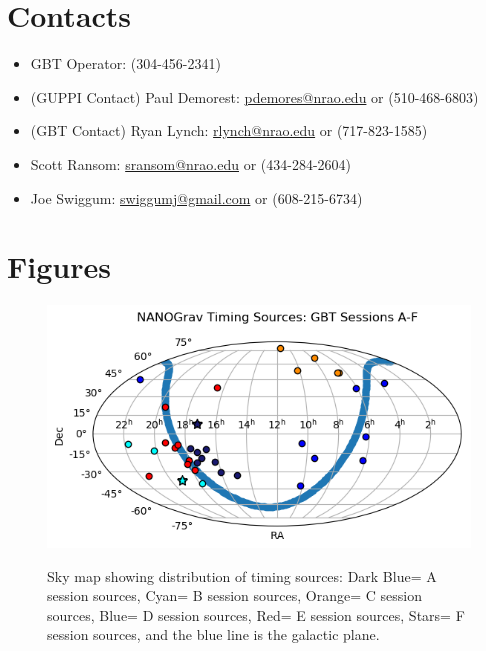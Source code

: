 \documentclass[11pt, reqno, tbtags]{article}
\begin{document}
\section{Contacts}\label{sec:con}  %
\begin{itemize}
 \item GBT Operator: (304-456-2341)
 \item (GUPPI Contact) Paul Demorest: \href{mailto:pdemores@nrao.edu}{pdemores@nrao.edu} or (510-468-6803)
 \item (GBT Contact) Ryan Lynch: \href{mailto:rlynch@nrao.edu}{rlynch@nrao.edu} or (717-823-1585)
 \item Scott Ransom: \href{mailto:sransom@nrao.edu}{sransom@nrao.edu} or (434-284-2604)
 \item Joe Swiggum: \href{mailto:swiggumj@gmail.com}{swiggumj@gmail.com} or (608-215-6734)
\end{itemize}



\newpage
\section{Figures}  %
\vspace{1cm}

\begin{figure}[h]
 \centering
  {\includegraphics{gbt_sources_galactic_plane_12-2017.png}}
  \caption{Sky map showing distribution of timing sources: Dark Blue= A session sources, Cyan= B session sources, Orange= C session sources, Blue= D session sources, Red= E session sources, Stars= F session sources, and the blue line is the galactic plane.}
  \label{fig:map}
\end{figure}
\end{document}
